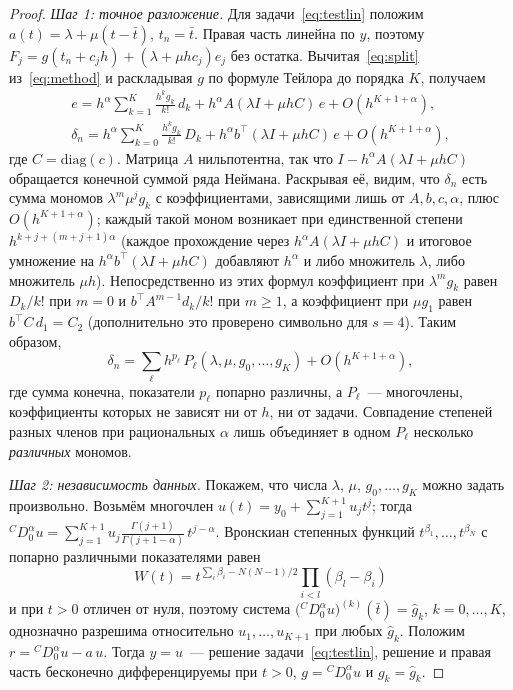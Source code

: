 \documentclass[11pt,a4paper]{article}
\theoremstyle{plain}
\theoremstyle{definition}
\newcommand{\G}{\Gamma}
\begin{document}
\begin{proof}
\emph{Шаг 1: точное разложение.} Для задачи~\eqref{eq:testlin} положим $a(t)=\lambda+\mu(t-\bar t)$, $t_n=\bar t$. Правая часть линейна по $y$, поэтому $F_j=g(t_n+c_jh)+(\lambda+\mu hc_j)e_j$ без остатка. Вычитая~\eqref{eq:split} из~\eqref{eq:method} и раскладывая $g$ по формуле Тейлора до порядка $K$, получаем
\begin{gather*}
e=h^{\alpha}\sum_{k=1}^{K}\frac{h^kg_k}{k!}\,d_k+h^{\alpha}A(\lambda I+\mu hC)\,e+O(h^{K+1+\alpha}),\\
\delta_n=h^{\alpha}\sum_{k=0}^{K}\frac{h^kg_k}{k!}\,D_k+h^{\alpha}b^{\top}(\lambda I+\mu hC)\,e+O(h^{K+1+\alpha}),
\end{gather*}
где $C=\mathrm{diag}(c)$. Матрица $A$ нильпотентна, так что $I-h^{\alpha}A(\lambda I+\mu hC)$ обращается конечной суммой ряда Неймана. Раскрывая её, видим, что $\delta_n$ есть сумма мономов $\lambda^{m}\mu^{j}g_k$ с коэффициентами, зависящими лишь от $A,b,c,\alpha$, плюс $O(h^{K+1+\alpha})$; каждый такой моном возникает при единственной степени $h^{k+j+(m+j+1)\alpha}$ (каждое прохождение через $h^{\alpha}A(\lambda I+\mu hC)$ и итоговое умножение на $h^{\alpha}b^{\top}(\lambda I+\mu hC)$ добавляют $h^{\alpha}$ и либо множитель $\lambda$, либо множитель $\mu h$). Непосредственно из этих формул коэффициент при $\lambda^mg_k$ равен $D_k/k!$ при $m=0$ и $b^{\top}A^{m-1}d_k/k!$ при $m\ge1$, а коэффициент при $\mu g_1$ равен $b^{\top}C\,d_1=C_2$ (дополнительно это проверено символьно для $s=4$). Таким образом,
\[
\delta_n=\sum_{\ell}h^{p_\ell}\,P_\ell(\lambda,\mu,g_0,\dots,g_K)+O(h^{K+1+\alpha}),
\]
где сумма конечна, показатели $p_\ell$ попарно различны, а $P_\ell$~--- многочлены, коэффициенты которых не зависят ни от $h$, ни от задачи. Совпадение степеней разных членов при рациональных $\alpha$ лишь объединяет в одном $P_\ell$ несколько \emph{различных} мономов.

\emph{Шаг 2: независимость данных.} Покажем, что числа $\lambda$, $\mu$, $g_0,\dots,g_K$ можно задать произвольно. Возьмём многочлен $u(t)=y_0+\sum_{j=1}^{K+1}u_jt^j$; тогда ${}^{C}\!D^{\alpha}_{0}u=\sum_{j=1}^{K+1}u_j\frac{\G(j+1)}{\G(j+1-\alpha)}\,t^{j-\alpha}$. Вронскиан степенных функций $t^{\beta_1},\dots,t^{\beta_N}$ с попарно различными показателями равен
\[
W(t)=t^{\sum_i\beta_i-N(N-1)/2}\prod_{i<l}(\beta_l-\beta_i)
\]
и при $t>0$ отличен от нуля, поэтому система $\bigl({}^{C}\!D^{\alpha}_{0}u\bigr)^{(k)}(\bar t)=\hat g_k$, $k=0,\dots,K$, однозначно разрешима относительно $u_1,\dots,u_{K+1}$ при любых $\hat g_k$. Положим $r={}^{C}\!D^{\alpha}_{0}u-a\,u$. Тогда $y=u$~--- решение задачи~\eqref{eq:testlin}, решение и правая часть бесконечно дифференцируемы при $t>0$, $g={}^{C}\!D^{\alpha}_{0}u$ и $g_k=\hat g_k$.


\end{proof}
\end{document}
